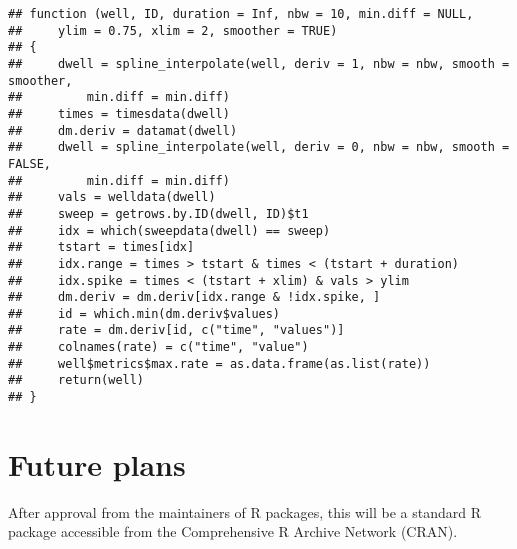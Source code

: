 \singlespacing
\begin{knitrout}
\color{fgcolor}\begin{kframe}
\begin{alltt}
\end{alltt}
\begin{verbatim}
## function (well, ID, duration = Inf, nbw = 10, min.diff = NULL, 
##     ylim = 0.75, xlim = 2, smoother = TRUE) 
## {
##     dwell = spline_interpolate(well, deriv = 1, nbw = nbw, smooth = smoother, 
##         min.diff = min.diff)
##     times = timesdata(dwell)
##     dm.deriv = datamat(dwell)
##     dwell = spline_interpolate(well, deriv = 0, nbw = nbw, smooth = FALSE, 
##         min.diff = min.diff)
##     vals = welldata(dwell)
##     sweep = getrows.by.ID(dwell, ID)$t1
##     idx = which(sweepdata(dwell) == sweep)
##     tstart = times[idx]
##     idx.range = times > tstart & times < (tstart + duration)
##     idx.spike = times < (tstart + xlim) & vals > ylim
##     dm.deriv = dm.deriv[idx.range & !idx.spike, ]
##     id = which.min(dm.deriv$values)
##     rate = dm.deriv[id, c("time", "values")]
##     colnames(rate) = c("time", "value")
##     well$metrics$max.rate = as.data.frame(as.list(rate))
##     return(well)
## }
\end{verbatim}
\end{kframe}
\end{knitrout}
\doublespacing

\section{Future plans}
After approval from the maintainers of R packages, this will be
a standard R package accessible from the Comprehensive R Archive Network (CRAN).





